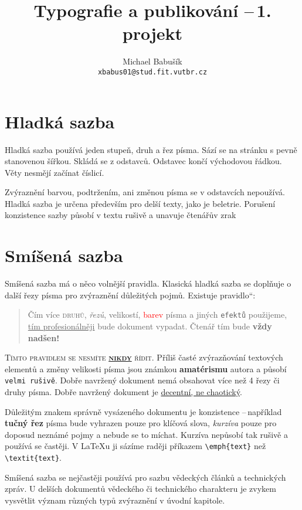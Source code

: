\documentclass[10pt,a4paper,twocolumn]{article}
\title{Typografie a publikování --\,1. projekt}
\author{Michael Babušík\\ \texttt{xbabus01@stud.fit.vutbr.cz}}
\date{}
\newcommand{\myuv}[1]{\quotedblbase #1\textquotedblleft}
\begin{document}
\maketitle

\section{Hladká sazba}
Hladká sazba používá jeden stupeň, druh a řez písma. Sází
se na stránku s pevně stanovenou šířkou. Skládá se z odstavců. Odstavec končí východovou řádkou. Věty nesmějí
začínat číslicí.
\par
Zvýraznění barvou, podtržením, ani změnou písma se
v odstavcích nepoužívá. Hladká sazba je určena především
pro delší texty, jako je beletrie. Porušení konzistence sazby
působí v textu rušivě a unavuje čtenářův zrak

\section{Smíšená sazba}
Smíšená sazba má o něco volnější pravidla. Klasická hladká
sazba se doplňuje o další řezy písma pro zvýraznění důležitých pojmů. Existuje \myuv{pravidlo}:
\par
\begin{quotation}
    Čím více \textsc{druhů}, \emph{řezů}, {\scriptsize velikostí}, \textcolor{red}{barev} písma
    a jiných \texttt{efektů} použijeme, \uline{tím profesionálněji}
    bude {\selectfont dokument} vypadat. Čtenář tím bude {\LARGE \bfseries vždy nadšen!}
\end{quotation}
\par
{\scshape Tímto pravidlem se nesmíte {\bfseries \uline{nikdy}} řídit}. Příliš časté zvýrazňování textových elementů a změny {\tiny velikosti}
písma jsou známkou {\bfseries amatérismu} autora a působí \texttt{velmi
    rušivě}. Dobře navržený dokument nemá obsahovat více
než 4 řezy či druhy písma. Dobře navržený dokument je \uline{decentní, ne chaotický}.
\par
Důležitým znakem správně vysázeného dokumentu je
konzistence --\,například {\bfseries tučný řez} písma bude vyhrazen
pouze pro klíčová slova, \emph{kurzíva} pouze pro doposud neznámé pojmy a nebude se to míchat. Kurzíva nepůsobí tak
rušivě a používá se častěji. V \LaTeX u ji sázíme raději příkazem \texttt{\textbackslash emph\{text\}} než \texttt{\textbackslash textit\{text\}}.
\par
Smíšená sazba se nejčastěji používá pro sazbu vědeckých
článků a technických zpráv. U delších dokumentů vědeckého či technického charakteru je zvykem vysvětlit význam
různých typů zvýraznění v úvodní kapitole.
\end{document}
